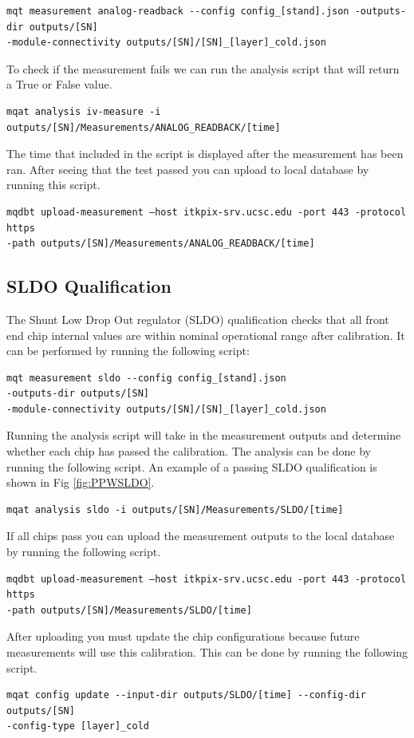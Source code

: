 \documentclass[12pt]{article}
\begin{document}
\begin{verbatim}
mqt measurement analog-readback --config config_[stand].json -outputs-dir outputs/[SN]
-module-connectivity outputs/[SN]/[SN]_[layer]_cold.json
\end{verbatim}

To check if the measurement fails we can run the analysis script that will return a True or False value. 
\begin{verbatim}
mqat analysis iv-measure -i outputs/[SN]/Measurements/ANALOG_READBACK/[time]
\end{verbatim}

The time that included in the script is displayed after the measurement has been ran. After seeing that the test passed you can upload to local database by running this script. 

\begin{verbatim}
mqdbt upload-measurement –host itkpix-srv.ucsc.edu -port 443 -protocol https
-path outputs/[SN]/Measurements/ANALOG_READBACK/[time]
\end{verbatim}

\subsection{SLDO Qualification}


The Shunt Low Drop Out regulator (SLDO) qualification checks that all front end chip internal values are within nominal operational range after calibration. It can be performed by running the following script:

\begin{verbatim}
mqt measurement sldo --config config_[stand].json 
-outputs-dir outputs/[SN]
-module-connectivity outputs/[SN]/[SN]_[layer]_cold.json
\end{verbatim}

Running the analysis script will take in the measurement outputs and determine whether each chip has passed the calibration. The analysis can be done by running the following script. An example of a passing SLDO qualification is shown in Fig \ref{fig:PPWSLDO}. 

\begin{verbatim}
mqat analysis sldo -i outputs/[SN]/Measurements/SLDO/[time]
\end{verbatim}
If all chips pass you can upload the measurement outputs to the local database by running the following script. 
\begin{verbatim}
mqdbt upload-measurement –host itkpix-srv.ucsc.edu -port 443 -protocol https
-path outputs/[SN]/Measurements/SLDO/[time]
\end{verbatim}
After uploading you must update the chip configurations because future measurements will use this calibration. This can be done by running the following script. 
\begin{verbatim}
mqat config update --input-dir outputs/SLDO/[time] --config-dir outputs/[SN] 
-config-type [layer]_cold
\end{verbatim}
\end{document}

